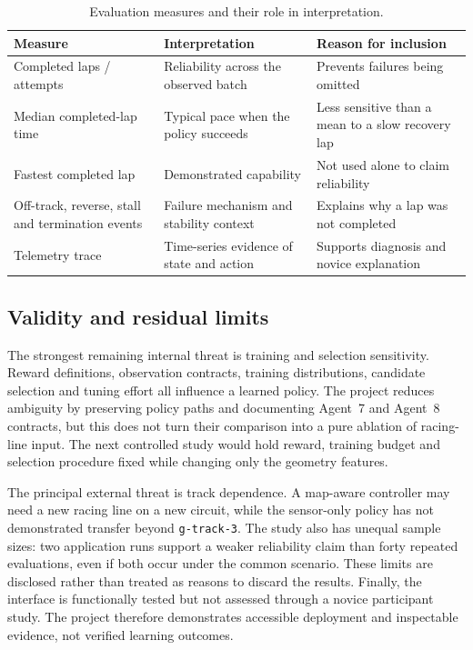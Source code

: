 \begin{table}[htbp]
  \centering
  \caption{Evaluation measures and their role in interpretation.}
  \label{tab:evaluation-measures}
  \small
  \begin{tabularx}{\textwidth}{p{}YY}
    \toprule
    Measure & Interpretation & Reason for inclusion \\
    \midrule
    Completed laps / attempts & Reliability across the observed batch & Prevents failures being omitted \\
    Median completed-lap time & Typical pace when the policy succeeds & Less sensitive than a mean to a slow recovery lap \\
    Fastest completed lap & Demonstrated capability & Not used alone to claim reliability \\
    Off-track, reverse, stall and termination events & Failure mechanism and stability context & Explains why a lap was not completed \\
    Telemetry trace & Time-series evidence of state and action & Supports diagnosis and novice explanation \\
    \bottomrule
  \end{tabularx}
\end{table}

\subsection{Validity and residual limits}

The strongest remaining internal threat is training and selection sensitivity. Reward definitions, observation contracts, training distributions, candidate selection and tuning effort all influence a learned policy. The project reduces ambiguity by preserving policy paths and documenting Agent~7 and Agent~8 contracts, but this does not turn their comparison into a pure ablation of racing-line input. The next controlled study would hold reward, training budget and selection procedure fixed while changing only the geometry features.

The principal external threat is track dependence. A map-aware controller may need a new racing line on a new circuit, while the sensor-only policy has not demonstrated transfer beyond \texttt{g-track-3}. The study also has unequal sample sizes: two application runs support a weaker reliability claim than forty repeated evaluations, even if both occur under the common scenario. These limits are disclosed rather than treated as reasons to discard the results. Finally, the interface is functionally tested but not assessed through a novice participant study. The project therefore demonstrates accessible deployment and inspectable evidence, not verified learning outcomes.


